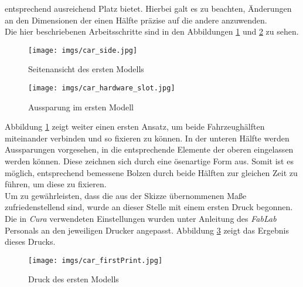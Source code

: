 \documentclass[.../Dokumentation.tex]{subfiles}
\begin{document}
entsprechend ausreichend Platz bietet.
Hierbei galt es zu beachten, Änderungen an den Dimensionen der einen 
Hälfte präzise auf die andere anzuwenden.\\
Die hier beschriebenen Arbeitsschritte sind in den Abbildungen 
\ref{fig-car-side} und \ref{fig-car-slot} zu sehen.
\begin{figure}[H]
\begin{center}
    \texttt{[image: imgs/car\_side.jpg]}
    \caption{Seitenansicht des ersten Modells}
    \label{fig-car-side}
\end{center}
\end{figure}
\begin{figure}[H]
\begin{center}
    \texttt{[image: imgs/car\_hardware\_slot.jpg]}
    \caption{Aussparung im ersten Modell}
    \label{fig-car-slot}
\end{center}
\end{figure}
\noindent
Abbildung \ref{fig-car-side} zeigt weiter einen ersten Ansatz, um beide 
Fahrzeughälften miteinander verbinden und so fixieren zu können. 
In der unteren Hälfte werden Aussparungen vorgesehen, in die entsprechende 
Elemente der oberen eingelassen werden können. Diese zeichnen sich durch eine 
ösenartige Form aus. Somit ist es möglich, entsprechend bemessene Bolzen durch 
beide Hälften zur gleichen Zeit zu führen, um diese zu fixieren.\\
Um zu gewährleisten, dass die aus der Skizze übernommenen Maße 
zufriedenstellend sind, wurde an dieser Stelle mit einem ersten Druck begonnen.
Die in \textit{Cura} verwendeten Einstellungen wurden unter Anleitung 
des \textit{FabLab} Personals an den jeweiligen Drucker angepasst. 
Abbildung \ref{fig-car-firstPrint} zeigt das Ergebnis dieses Drucks.
\begin{figure}[H]
    \begin{center}
        \texttt{[image: imgs/car\_firstPrint.jpg]}
        \caption{Druck des ersten Modells}
        \label{fig-car-firstPrint}
    \end{center}
    \end{figure}
\end{document}

